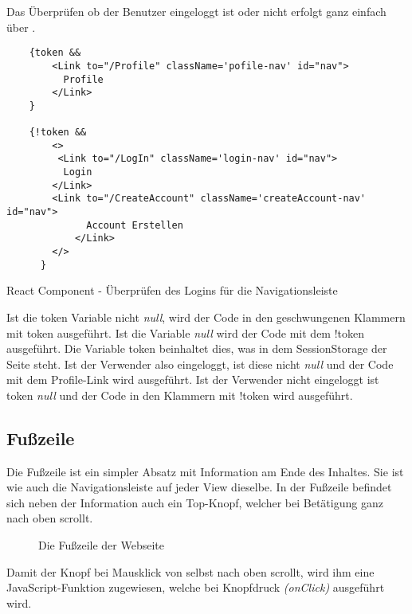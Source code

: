 \pagebreak

Das Überprüfen ob der Benutzer eingeloggt ist oder nicht erfolgt ganz einfach über .


\begin{code}[htp]
\begin{lstlisting}
    {token && 
        <Link to="/Profile" className='pofile-nav' id="nav">
          Profile
        </Link>
    }

    {!token &&
        <>
         <Link to="/LogIn" className='login-nav' id="nav">
          Login
        </Link>
        <Link to="/CreateAccount" className='createAccount-nav' id="nav">
              Account Erstellen
            </Link>
        </>
      }
\end{lstlisting}
\caption{React Component - Überprüfen des Logins für die Navigationsleiste}
\end{code}

Ist die token Variable nicht \textit{null}, wird der Code in den geschwungenen Klammern 
mit token ausgeführt. Ist die Variable \textit{null} wird der Code mit dem !token ausgeführt. 
Die Variable token beinhaltet dies, was in dem SessionStorage der Seite steht. Ist der Verwender also eingeloggt, ist diese 
nicht \textit{null} und der Code mit dem Profile-Link wird ausgeführt. Ist der Verwender nicht eingeloggt ist token 
\textit{null} und der Code in den Klammern mit !token wird ausgeführt.

\subsection{Fußzeile}
\label{footer}

Die Fußzeile ist ein simpler Absatz mit Information am Ende des Inhaltes.
Sie ist wie auch die Navigationsleiste auf jeder View dieselbe. In der Fußzeile befindet sich neben 
der Information auch ein Top-Knopf, welcher bei Betätigung ganz nach oben scrollt. 

\begin{figure}[H]
    \begin{center}
      \caption{Die Fußzeile der Webseite}
    \end{center}
\end{figure}

\pagebreak

Damit der Knopf bei Mausklick von selbst nach oben scrollt, wird ihm eine JavaScript-Funktion 
zugewiesen, welche bei Knopfdruck \textit{(onClick)} ausgeführt wird.

